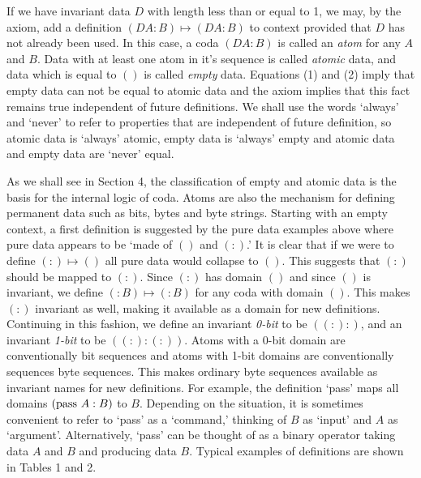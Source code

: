 \documentclass[11pt]{article}
\begin{document}
      If we have invariant data $D$ with length less than or equal to 1, we may, by the axiom, 
add a definition $(D A:B)\mapsto(D A:B)$ to context provided 
that $D$ has not already been used.  In this case, a coda $(D A:B)$ is called an {\it atom} for any $A$ and $B$.  
Data with at least one atom in it's sequence is called {\it atomic} data, and data which is equal to $()$ is called {\it empty} data. 
Equations (1) and (2) imply that empty data can not be equal to atomic data and the axiom implies that this fact remains 
true independent of future definitions.  We shall use the words `always' and `never' to refer to properties that are independent of 
future definition, so atomic data is `always' atomic, empty data is `always' empty and atomic data and empty data are `never' equal.  

    As we shall see in Section 4, the classification of empty and atomic data is the basis for the internal logic of coda.  
Atoms are also the mechanism for defining permanent data such as bits, bytes and byte strings.   
Starting with an empty context, a first definition is suggested by the pure data examples above where pure data 
appears to be `made of $()$ and $(:)$.'  
It is clear that if we were to define $(:)\mapsto()$ all pure data would collapse to $()$.  This suggests that $(:)$ should be 
mapped to $(:)$.  Since $(:)$ has domain $()$ and since $()$ is invariant, we define $(:B)\mapsto(:B)$ for any coda with 
domain $()$.  This makes $(:)$ invariant as well, making it available as a domain for new definitions.  
Continuing in this fashion, we define an invariant {\it 0-bit} to be $((:):)$, and an invariant {\it 1-bit} to be $((:):(:))$.  
Atoms with a 0-bit domain are conventionally bit sequences and atoms with 1-bit domains are conventionally sequences byte sequences.  
This makes ordinary byte sequences available as invariant names for new definitions.  For example, the definition `pass' maps 
all domains $({\rm pass}\ A:B)$ to $B$.  Depending on the situation, 
it is sometimes convenient to refer to `pass' as a `command,' thinking of $B$ as 
`input' and $A$ as `argument'.  Alternatively, `pass' can be thought of as a binary operator taking data $A$ and $B$ and producing data $B$. 
Typical examples of definitions are shown in Tables 1 and 2.  
\end{document}
